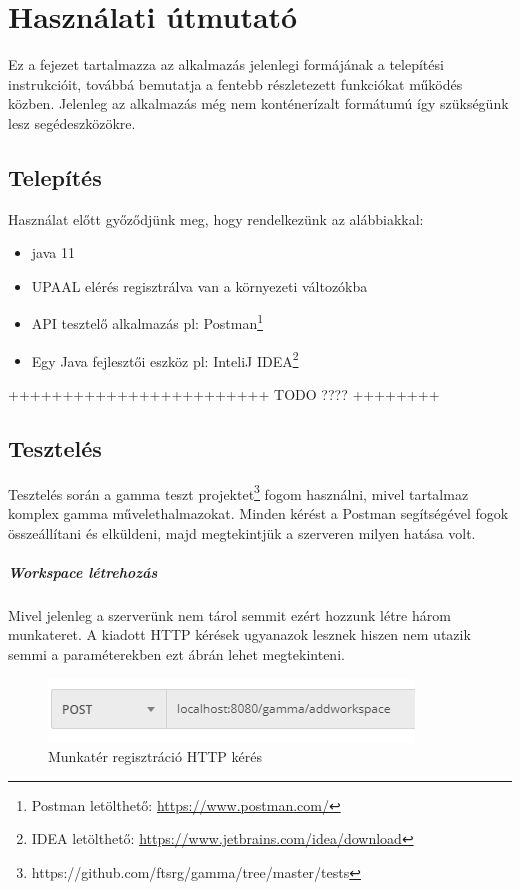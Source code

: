 
\chapter{Használati útmutató}

Ez a fejezet tartalmazza az alkalmazás jelenlegi formájának a telepítési instrukcióit, továbbá bemutatja a fentebb részletezett funkciókat működés közben. Jelenleg az alkalmazás még nem konténerízalt formátumú így szükségünk lesz segédeszközökre. 
\section{Telepítés}

Használat előtt győződjünk meg, hogy rendelkezünk az alábbiakkal:
\begin{itemize}
	\item java 11
	\item UPAAL elérés regisztrálva van a környezeti változókba
	\item API tesztelő alkalmazás pl: Postman\footnote{Postman letölthető: \url{https://www.postman.com/}}
	\item Egy Java fejlesztői eszköz pl: InteliJ IDEA\footnote{IDEA letölthető: \url{https://www.jetbrains.com/idea/download}}
\end{itemize}
++++++++++++++++++++++++ TODO ???? ++++++++
\section{Tesztelés}

Tesztelés során a gamma teszt projektet\footnote{https://github.com/ftsrg/gamma/tree/master/tests} fogom használni, mivel tartalmaz komplex gamma művelethalmazokat. Minden kérést a Postman segítségével fogok összeállítani és elküldeni, majd megtekintjük a szerveren milyen hatása volt.

\paragraph{Workspace létrehozás} Mivel jelenleg a szerverünk nem tárol semmit ezért hozzunk létre három munkateret. A kiadott HTTP kérések ugyanazok lesznek hiszen nem utazik semmi a paraméterekben ezt  ábrán lehet megtekinteni.
\begin{figure}[!ht]
	\centering
	\includegraphics[keepaspectratio]{figures/addworkspace_test.PNG}
	\caption{Munkatér regisztráció HTTP kérés}
	\label{fig:addworkspace_test}
\end{figure}

